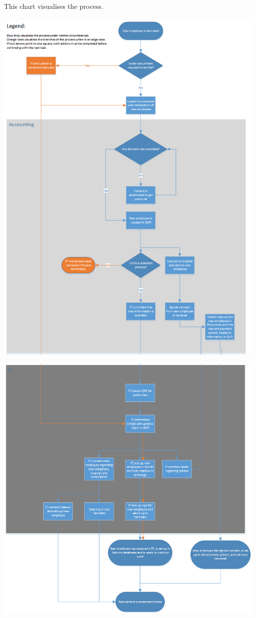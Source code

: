 \label{app:ProcessChart}

This chart visualises the process.\\\\

\includegraphics[scale=0.65]{appendix/ProcessFlowChart1.png}

\newpage

\includegraphics[scale=0.65]{appendix/ProcessFlowChart2.png}